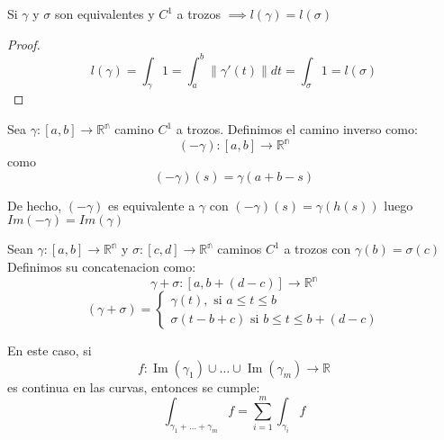    \begin{corolario}
        Si $\gamma$ y $\sigma$ son equivalentes y $C^1$ a trozos $\implies l(\gamma)=l(\sigma)$
    \end{corolario}

    \begin{proof}
        $$l(\gamma) =\int_{\gamma}1=\int_{a}^{b} \lVert \gamma'(t) \rVert dt=\int_{\sigma}1=l(\sigma)$$
    \end{proof}

    \begin{definición}
    Sea $\gamma:[a,b] \to \mathbb{R^n}$ camino $C^1$ a trozos. Definimos el camino inverso como: \\
$$(-\gamma):[a,b] \to \mathbb{R^n}$$ como $$ (-\gamma)(s)=\gamma(a+b-s)$$
    \end{definición}

    \begin{observación}
    De hecho, $(-\gamma)$ es equivalente a $\gamma$ con $(-\gamma)(s)=\gamma(h(s))$ luego $Im(-\gamma)=Im(\gamma)$
    \end{observación}

    \begin{definición}
    Sean $\gamma:[a,b] \to \mathbb{R^n}$ y $\sigma:[c,d] \to \mathbb{R^n}$ caminos $C^1$ a trozos con $\gamma(b)=\sigma(c)$\\
    Definimos su concatenacion como:\\
$$\gamma + \sigma:[a,b+(d-c)] \to \mathbb{R^n}$$
$$(\gamma + \sigma) = \begin{cases}
    \gamma(t), \text{ si } a \leq t \leq b \\
    \sigma(t - b + c) \text{ si } b\leq t \leq b+(d-c)
\end{cases}$$
\end{definición}

\begin{observación}
En este caso, si
\[
    f : \operatorname{Im}(\gamma_1) \cup \dots \cup \operatorname{Im}(\gamma_m) \longrightarrow \mathbb{R}
\]
es continua en las curvas, entonces se cumple:
\[
    \int_{\gamma_1 + \dots + \gamma_m} f = \sum_{i=1}^{m} \int_{\gamma_i} f
\]
\end{observación}

